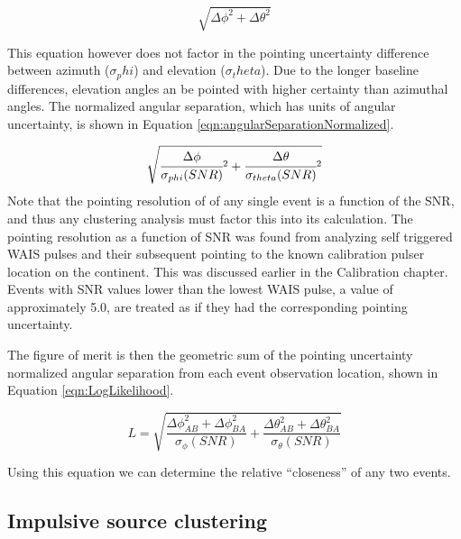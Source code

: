	\begin{equation}
		\sqrt{\Delta\phi^2 + \Delta\theta^2}
		\label{eqn:angularSeparation}
	\end{equation}
	
	This equation however does not factor in the pointing uncertainty difference between azimuth ($\sigma_phi$) and elevation ($\sigma_theta$). Due to the longer baseline differences, elevation angles an be pointed with higher certainty than azimuthal angles.  The normalized angular separation, which has units of angular uncertainty, is shown in Equation \ref{eqn:angularSeparationNormalized}.
	
	\begin{equation}
		\sqrt{\cfrac{\Delta\phi}{\sigma_{phi}(SNR)}^2 + \cfrac{\Delta\theta}{\sigma_{theta}(SNR)}^2}
		\label{eqn:angularSeparationNormalized}
	\end{equation}
		Note that the pointing resolution  of of any single event is a function of the SNR, and thus any clustering analysis must factor this into its calculation.  The pointing resolution as a function of SNR was found from analyzing self triggered WAIS pulses and their subsequent pointing to the known calibration pulser location on the continent.  This was discussed earlier in the Calibration chapter.  Events with SNR values lower than the lowest WAIS pulse, a value of approximately 5.0, are treated as if they had the corresponding pointing uncertainty.
		
		The figure of merit is then the geometric sum of the pointing uncertainty normalized angular separation from each event observation location, shown in Equation \ref{eqn:LogLikelihood}.
		
	\begin{equation}
		L = \sqrt{\frac{\Delta\phi_{AB}^2   + \Delta\phi_{BA}^2}{\sigma_{\phi}(SNR)} + \frac{\Delta\theta_{AB}^2 + \Delta\theta_{BA}^2}{\sigma_{\theta}(SNR)}}
		\label{eqn:LogLikelihood}
	\end{equation}


		Using this equation we can determine the relative ``closeness'' of any two events.  
		
	
	\subsection{Impulsive source clustering}
	
